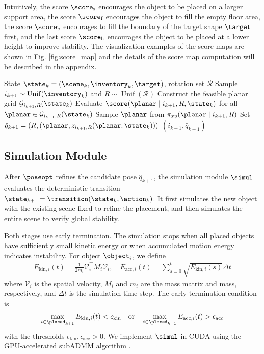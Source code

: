 Intuitively, the score $\score_\text{s}$ encourages the object to be placed on a larger support area, the score $\score_\text{f}$ encourages the object to fill the empty floor area, the score $\score_\text{b}$ encourages to fill the boundary of the target shape $\target$ first, and the last score $\score_\text{h}$ encourages the object to be placed at a lower height to improve stability.
The visualization examples of the score maps are shown in Fig. \ref{fig:score_map} and the details of the score map computation will be described in the appendix.

\begin{algorithm}[t]
  \caption{Initial pose sampling $\initpose(\state_k)$}
  \label{alg:initial_pose_sampling}
  \begin{algorithmic}[1]
    \Require State $\state_k=(\scene_k,\inventory_k,\target)$, rotation set $\mathcal{R}$
    \State Sample $i_{k+1}\sim\operatorname{Unif}(\inventory_k)$ and
           $R\sim\operatorname{Unif}(\mathcal{R})$
    \State Construct the feasible planar grid
           $\mathcal{G}_{i_{k+1},R}(\state_k)$
    \State Evaluate $\score(\planar\mid i_{k+1},R,\state_k)$ for all
           $\planar\in\mathcal{G}_{i_{k+1},R}(\state_k)$
    \State Sample $\planar$ from $\pi_{xy}(\planar\mid i_{k+1},R)$
    \State Set $\hat{q}_{k+1}=(R,(\planar,z_{i_{k+1},R}(\planar;\state_k)))$
    \State \Return $(i_{k+1},\hat{q}_{k+1})$
  \end{algorithmic}
\end{algorithm}

\subsection{Simulation Module}

After $\poseopt$ refines the candidate pose $\hat{q}_{k+1}$, the simulation
module $\simul$ evaluates the deterministic transition
$\state_{k+1}=\transition(\state_k,\action_k)$. It first simulates the new
object with the existing scene fixed to refine the placement, and then
simulates the entire scene to verify global stability.

Both stages use early termination. The simulation stops when all placed
objects have sufficiently small kinetic energy or when accumulated motion
energy indicates instability. For object $\object_i$, we define
\begin{align*}
    E_{\text{kin},i}(t) = \frac{1}{2m_i}\mathcal{V}_i^\top M_i \mathcal{V}_i, \quad 
    E_{\text{acc},i}(t) = \sum_{s=0}^{t} \sqrt{E_{\text{kin},i}(s)} \Delta t
\end{align*}
where $\mathcal{V}_i$ is the spatial velocity, $M_i$ and $m_i$ are the mass
matrix and mass, respectively, and $\Delta t$ is the simulation time step.
The early-termination condition is
\begin{equation}
    \max_{i \in \placed_{k+1}} E_{\text{kin},i}(t) < \epsilon_\text{kin}
    \quad\text{or}\quad
    \max_{i \in \placed_{k+1}} E_{\text{acc},i}(t) > \epsilon_\text{acc}
\end{equation}
with the thresholds $\epsilon_\text{kin}, \epsilon_\text{acc} > 0$.
We implement $\simul$ in CUDA using the GPU-accelerated subADMM algorithm
\cite{ji2025gpu}.

